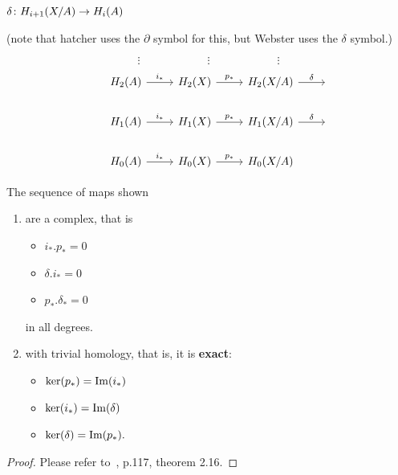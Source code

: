 \documentclass[11pt,leqno,oneside]{amsart}
\numberwithin{thm}{section}
\newcommand{\homl}[1][n]{H_{#1}}
\begin{document}



\begin{thm}
  $\delta \colon H_{i+1}(X/A) \to H_i(A)$

  (note that hatcher uses the $\partial$ symbol for this, but Webster uses the $\delta$ symbol.)
\end{thm}
\begin{example}
  $$\vdots\qquad\qquad\qquad\vdots\qquad\qquad\qquad\vdots$$
  $$\begin{tikzcd}
    &\homl[2](A) \arrow[r, "i_*"] &\homl[2](X) \arrow[r, "p_*"] &\homl[2](X/A) \arrow[r, "\delta"] &~ \\
    &\homl[1](A) \arrow[r, "i_*"] &\homl[1](X) \arrow[r, "p_*"] &\homl[1](X/A) \arrow[r, "\delta"] &~ \\
    &\homl[0](A) \arrow[r, "i_*"] &\homl[0](X) \arrow[r, "p_*"] &\homl[0](X/A)                     &~
  \end{tikzcd}$$
\end{example}

\begin{thm}
  The sequence of maps shown
  \begin{enumerate}
    \item are a complex, that is
    \begin{itemize}
      \item $i_*.p_* = 0$
      \item $\delta.i_* = 0$
      \item $p_*.\delta_* = 0$
    \end{itemize}
    in all degrees.

    \item with trivial homology, that is, it is \textbf{exact}:
    \begin{itemize}
      \item $\ker(p_*) = \operatorname{Im}(i_*)$
      \item $\ker(i_*) = \operatorname{Im}(\delta)$
      \item $\ker(\delta) = \operatorname{Im}(p_*).$
    \end{itemize}
  \end{enumerate}
\end{thm}
\begin{proof}
  Please refer to~\cite{Hatcher}, p.117, theorem 2.16.
\end{proof}
\end{document}
